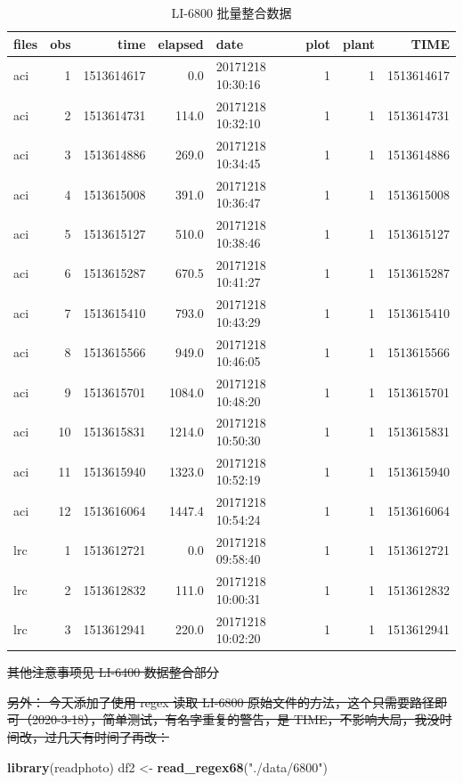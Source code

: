 \documentclass[
]{krantz}
\makeatletter
\newenvironment{Shaded}{\begin{snugshade}}{\end{snugshade}}
\newcommand{\KeywordTok}[1]{\textcolor[rgb]{0.13,0.29,0.53}{\textbf{#1}}}
\newcommand{\NormalTok}[1]{#1}
\newcommand{\StringTok}[1]{\textcolor[rgb]{0.31,0.60,0.02}{#1}}
\newenvironment{kframe}{%
\medskip{}
\setlength{\fboxsep}{.8em}
 \def\at@end@of@kframe{}%
 \ifinner\ifhmode%
  \def\at@end@of@kframe{\end{minipage}}%
  \begin{minipage}{\columnwidth}%
 \fi\fi%
 \def\FrameCommand##1{\hskip\@totalleftmargin \hskip-\fboxsep
 \colorbox{shadecolor}{##1}\hskip-\fboxsep
     \hskip-\linewidth \hskip-\@totalleftmargin \hskip\columnwidth}%
 \MakeFramed {\advance\hsize-\width
   \@totalleftmargin\z@ \linewidth\hsize
   \@setminipage}}%
 {\par\unskip\endMakeFramed%
 \at@end@of@kframe}
\renewenvironment{Shaded}{\begin{kframe}}{\end{kframe}}
\makeatother
\begin{document}
\begin{table}

\caption{\label{tab:unnamed-chunk-8}LI-6800 批量整合数据}
\centering
\begin{tabular}[t]{lrrrlrrr}
\toprule
files & obs & time & elapsed & date & plot & plant & TIME\\
\midrule
aci & 1 & 1513614617 & 0.0 & 20171218 10:30:16 & 1 & 1 & 1513614617\\
aci & 2 & 1513614731 & 114.0 & 20171218 10:32:10 & 1 & 1 & 1513614731\\
aci & 3 & 1513614886 & 269.0 & 20171218 10:34:45 & 1 & 1 & 1513614886\\
aci & 4 & 1513615008 & 391.0 & 20171218 10:36:47 & 1 & 1 & 1513615008\\
aci & 5 & 1513615127 & 510.0 & 20171218 10:38:46 & 1 & 1 & 1513615127\\
\addlinespace
aci & 6 & 1513615287 & 670.5 & 20171218 10:41:27 & 1 & 1 & 1513615287\\
aci & 7 & 1513615410 & 793.0 & 20171218 10:43:29 & 1 & 1 & 1513615410\\
aci & 8 & 1513615566 & 949.0 & 20171218 10:46:05 & 1 & 1 & 1513615566\\
aci & 9 & 1513615701 & 1084.0 & 20171218 10:48:20 & 1 & 1 & 1513615701\\
aci & 10 & 1513615831 & 1214.0 & 20171218 10:50:30 & 1 & 1 & 1513615831\\
\addlinespace
aci & 11 & 1513615940 & 1323.0 & 20171218 10:52:19 & 1 & 1 & 1513615940\\
aci & 12 & 1513616064 & 1447.4 & 20171218 10:54:24 & 1 & 1 & 1513616064\\
lrc & 1 & 1513612721 & 0.0 & 20171218 09:58:40 & 1 & 1 & 1513612721\\
lrc & 2 & 1513612832 & 111.0 & 20171218 10:00:31 & 1 & 1 & 1513612832\\
lrc & 3 & 1513612941 & 220.0 & 20171218 10:02:20 & 1 & 1 & 1513612941\\
\bottomrule
\end{tabular}
\end{table}

\sout{其他注意事项见 LI-6400 数据整合部分}

\sout{另外： 今天添加了使用 regex 读取 LI-6800 原始文件的方法，这个只需要路径即可（2020-3-18），简单测试，有名字重复的警告，是 TIME，不影响大局，我没时间改，过几天有时间了再改：}

\begin{Shaded}
\begin{Highlighting}[]
\KeywordTok{library}\NormalTok{(readphoto)}
\NormalTok{df2 \textless{}{-}}\StringTok{ }\KeywordTok{read\_regex68}\NormalTok{(}\StringTok{"./data/6800"}\NormalTok{)}
\end{Highlighting}
\end{Shaded}
\end{document}
